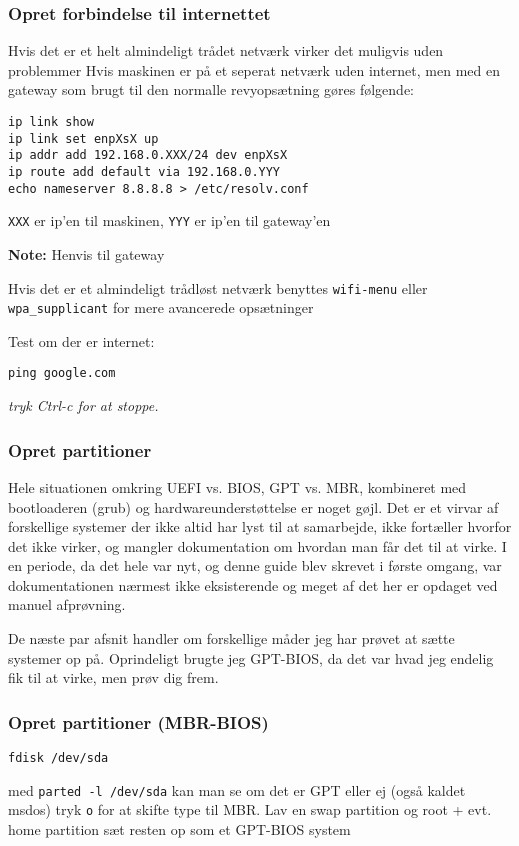 \documentclass[10pt,a4paper,danish]{article}
\newcommand{\note}[1]{\begin{mdframed}[style=note]\textbf{Note:}
    #1\end{mdframed}}
\newcommand{\code}[1]{\colorbox{verbgray}{\texttt{#1}}}
\begin{document}
\subsubsection{Opret forbindelse til internettet}
Hvis det er et helt almindeligt trådet netværk virker det muligvis uden
problemmer
Hvis maskinen er på et seperat netværk uden internet, men med en gateway som
brugt til den normalle revyopsætning gøres følgende:
\begin{verbatim}
ip link show
ip link set enpXsX up
ip addr add 192.168.0.XXX/24 dev enpXsX
ip route add default via 192.168.0.YYY
echo nameserver 8.8.8.8 > /etc/resolv.conf
\end{verbatim}
\texttt{XXX} er ip'en til maskinen, \texttt{YYY} er ip'en til gateway'en
\note{Henvis til gateway}

Hvis det er et almindeligt trådløst netværk benyttes \code{wifi-menu} eller
\texttt{wpa\_supplicant} for mere avancerede opsætninger

Test om der er internet:
\begin{verbatim}
ping google.com
\end{verbatim}
\textit{tryk Ctrl-c for at stoppe.}

\newpage
\subsubsection{Opret partitioner}
Hele situationen omkring UEFI vs. BIOS, GPT vs. MBR, kombineret med bootloaderen
(grub) og hardwareunderstøttelse er noget gøjl.
Det er et virvar af forskellige systemer der ikke altid har lyst til at
samarbejde, ikke fortæller hvorfor det ikke virker, og mangler dokumentation om
hvordan man får det til at virke.
I en periode, da det hele var nyt, og denne guide blev skrevet i første omgang,
var dokumentationen nærmest ikke eksisterende og meget af det her er opdaget ved
manuel afprøvning.

De næste par afsnit handler om forskellige måder jeg har prøvet at sætte
systemer op på.
Oprindeligt brugte jeg GPT-BIOS, da det var hvad jeg endelig fik til at virke,
men prøv dig frem.

\subsubsection{Opret partitioner (MBR-BIOS)}
\begin{verbatim}
fdisk /dev/sda
\end{verbatim}
med \code{parted -l /dev/sda} kan man se om det er GPT eller ej (også kaldet msdos)
tryk \texttt{o} for at skifte type til MBR.
Lav en swap partition og root + evt. home partition
sæt resten op som et GPT-BIOS system
\end{document}
